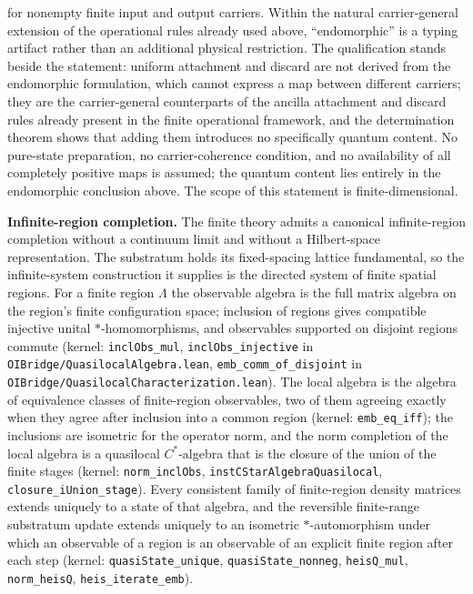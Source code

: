\documentclass[
]{article}
\begin{document}
for nonempty finite input and output carriers. Within the natural
carrier-general extension of the operational rules already used above,
``endomorphic'' is a typing artifact rather than an additional physical
restriction. The qualification stands beside the statement: uniform
attachment and discard are not derived from the endomorphic formulation,
which cannot express a map between different carriers; they are the
carrier-general counterparts of the ancilla attachment and discard rules
already present in the finite operational framework, and the
determination theorem shows that adding them introduces no specifically
quantum content. No pure-state preparation, no carrier-coherence
condition, and no availability of all completely positive maps is
assumed; the quantum content lies entirely in the endomorphic conclusion
above. The scope of this statement is finite-dimensional.

\textbf{Infinite-region completion.} The finite theory admits a
canonical infinite-region completion without a continuum limit and
without a Hilbert-space representation. The substratum holds its
fixed-spacing lattice fundamental, so the infinite-system construction
it supplies is the directed system of finite spatial regions. For a
finite region \(\Lambda\) the observable algebra is the full matrix
algebra on the region's finite configuration space; inclusion of regions
gives compatible injective unital \(*\)-homomorphisms, and observables
supported on disjoint regions commute (kernel: \texttt{inclObs\_mul},
\texttt{inclObs\_injective} in \texttt{OIBridge/QuasilocalAlgebra.lean},
\texttt{emb\_comm\_of\_disjoint} in\\
\texttt{OIBridge/QuasilocalCharacterization.lean}). The local algebra is
the algebra of equivalence classes of finite-region observables, two of
them agreeing exactly when they agree after inclusion into a common
region (kernel: \texttt{emb\_eq\_iff}); the inclusions are isometric for
the operator norm, and the norm completion of the local algebra is a
quasilocal \(C^{*}\)-algebra that is the closure of the union of the
finite stages (kernel: \texttt{norm\_inclObs},
\texttt{instCStarAlgebraQuasilocal}, \texttt{closure\_iUnion\_stage}).
Every consistent family of finite-region density matrices extends
uniquely to a state of that algebra, and the reversible finite-range
substratum update extends uniquely to an isometric \(*\)-automorphism
under which an observable of a region is an observable of an explicit
finite region after each step (kernel: \texttt{quasiState\_unique},
\texttt{quasiState\_nonneg}, \texttt{heisQ\_mul}, \texttt{norm\_heisQ},
\texttt{heis\_iterate\_emb}).
\end{document}
